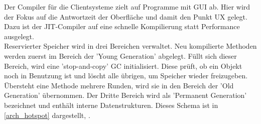 Der Compiler für die Clientsysteme zielt auf Programme mit \ac{GUI} ab. Hier wird der Fokus auf die Antwortzeit der Oberfläche und damit den Punkt \ac{UX} gelegt. Dazu ist der \ac{JIT}-Compiler auf eine schnelle Kompilierung statt Performance ausgelegt.\\
Reservierter Speicher wird in drei Bereichen verwaltet. Neu kompilierte Methoden werden zuerst im Bereich der 'Young Generation' abgelegt. Füllt sich dieser Bereich, wird eine 'stop-and-copy' \ac{GC} initialisiert. Diese prüft, ob ein Objekt noch in Benutzung ist und löscht alle übrigen, um Speicher wieder freizugeben. Übersteht eine Methode mehrere Runden, wird sie in den Bereich der 'Old Generation' übernommen. Der Dritte Bereich wird als 'Permanent Generation' bezeichnet und enthält interne Datenstrukturen. Dieses Schema ist in \autoref{arch_hotspot} dargestellt, \cite[vgl. Kotzmann und Wimmer 2008, S.3f]{KotzmannWimmer2008}.\\

